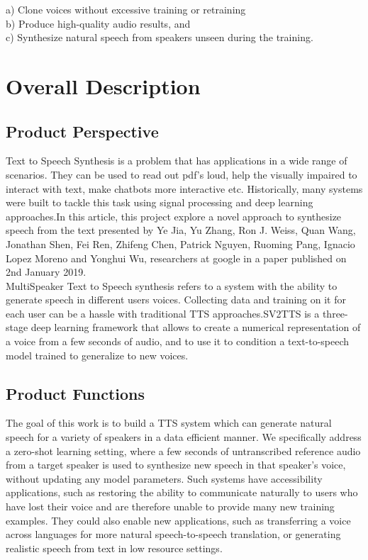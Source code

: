 \documentclass[12pt]{report}
\begin{document}
a) Clone voices without excessive training or retraining\\

b) Produce high-quality audio results, and\\

c) Synthesize natural speech from speakers unseen during the training.\\


\chapter{Overall Description}

\section{Product Perspective}
Text to Speech Synthesis is a problem that has applications in a wide range of scenarios. They can be used to read out pdf's loud, help the visually impaired to interact with text, make chatbots more interactive etc. Historically, many systems were built to tackle this task using signal processing and deep learning approaches.In this article, this project explore a novel approach to synthesize speech from the text presented by Ye Jia, Yu Zhang, Ron J. Weiss, Quan Wang, Jonathan Shen, Fei Ren, Zhifeng Chen, Patrick Nguyen, Ruoming Pang, Ignacio Lopez Moreno and  Yonghui Wu, researchers at google in a paper published on 2nd January 2019.\\

MultiSpeaker Text to Speech synthesis refers to a system with the ability to generate speech in different users voices. Collecting data and training on it for each user can be a hassle with traditional TTS approaches.SV2TTS is a three-stage deep learning framework that allows to create a numerical representation of a voice from a few seconds of audio, and to use it to condition a text-to-speech model trained to generalize to new voices.

\section{Product Functions}
The goal of this work is to build a TTS system which can generate natural speech for a variety of
speakers in a data efficient manner. We specifically address a zero-shot learning setting, where a
few seconds of untranscribed reference audio from a target speaker is used to synthesize new speech
in that speaker’s voice, without updating any model parameters. Such systems have accessibility
applications, such as restoring the ability to communicate naturally to users who have lost their
voice and are therefore unable to provide many new training examples. They could also enable
new applications, such as transferring a voice across languages for more natural speech-to-speech
translation, or generating realistic speech from text in low resource settings.
\end{document}
